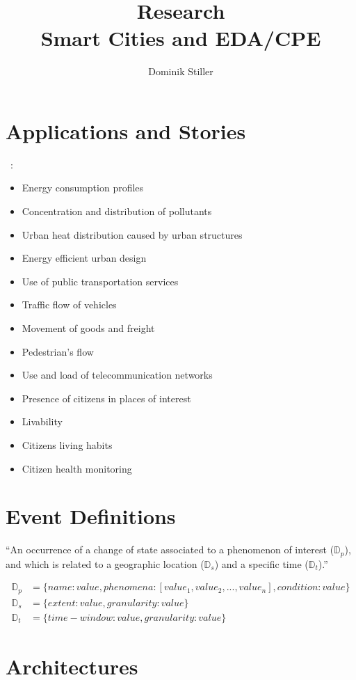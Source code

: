 \documentclass[]{scrartcl}
\title{Research \\ Smart Cities and EDA/CPE}
\author{Dominik Stiller}
\begin{document}
\maketitle


\section{Applications and Stories}
~\cite[p.~2]{Morales.2015}:
\begin{itemize}
	\item Energy consumption profiles
	\item Concentration and distribution of pollutants
	\item Urban heat distribution caused by urban structures
	\item Energy efficient urban design
	\item Use of public transportation services
	\item Traffic flow of vehicles
	\item Movement of goods and freight
	\item Pedestrian's flow
	\item Use and load of telecommunication networks
	\item Presence of citizens in places of interest
	\item Livability
	\item Citizens living habits
	\item Citizen health monitoring
\end{itemize}

\section{Event Definitions}

\enquote{An occurrence of a change of state associated to a phenomenon of interest ($\mathbb{D}_p$), and which is related to a geographic location ($\mathbb{D}_s$) and a specific time ($\mathbb{D}_t$).}~\cite[p.~3]{Morales.2015}

\begin{align*}
	\mathbb{D}_p &= \{name: value, phenomena: [value_1, value_2, ..., value_n], condition: value\} \\
	\mathbb{D}_s &= \{extent: value, granularity: value\} \\
	\mathbb{D}_t &= \{time-window: value, granularity: value\}
\end{align*}


\section{Architectures}
\end{document}
